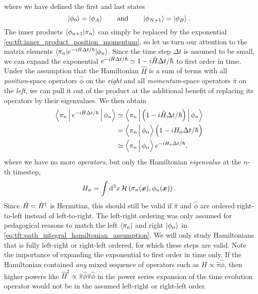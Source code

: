 where we have defined the first and last states
\begin{equation}
	\ket{\phi_0} = \ket{\phi_A}
	\qquad \text{and} \qquad
	\ket{\phi_{N+1}} = \ket{\phi_B}.
\label{eq:tft:bosonic_end_states}
\end{equation}
The inner products $\braket{\phi_{n+1} | \pi_n}$ can simply be replaced by the exponential \eqref{eq:tft:inner_product_position_momentum}, so let us turn our attention to the matrix elements $\braket{\pi_n | e^{- i \hat{H} \Delta t / \hbar} | \phi_n}$.
Since the time step $\Delta t$ is assumed to be small, we can expand the exponential $\smash[t]{e^{- i \hat{H} \Delta t / \hbar}} \simeq 1 - i \hat{H} \Delta t / \hbar$ to first order in time.
Under the assumption that the Hamiltonian $\hat{H}$ is a sum of terms with all \emph{position}-space operators $\hat{\phi}$ on the \emph{right} and all \emph{momentum}-space operators $\hat{\pi}$ on the \emph{left}, we can pull it out of the product at the additional benefit of replacing its operators by their eigenvalues.
We then obtain
\begin{equation}
\begin{split}
	\Braket{\pi_n | e^{- i \hat{H} \Delta t / \hbar} | \phi_n} &\taylor \Braket{\pi_n | \Big( 1 - i \hat{H} \Delta t / \hbar \Big) | \phi_n} \\
	                                                           &=       \Braket{\vphantom{\hat{H}} \pi_n | \phi_n} \Big( 1 - i H_n \Delta t / \hbar \Big) \\
	                                                           &\taylor \Braket{\vphantom{\hat{H}} \pi_n | \phi_n} e^{- i H_n \Delta t / \hbar}, \\
\end{split}
\label{eq:tft:path_integral_hamiltonian_assumption}
\end{equation}
where we have no more \emph{operators}, but only the Hamiltonian \emph{eigenvalue} at the $n$-th timestep,
\begin{equation}
	H_n = \int \mathop{}\!\mathrm{d}^3 x \, \mathcal{H} \left( \pi_n({\bm{x}}), \phi_n({\bm{x}}) \right) .
\label{eq:tft:hamiltonian_eigenvalues}
\end{equation}
Since $\smash[t]{\hat{H}} = \smash[t]{\hat{H}^\dagger}$ is Hermitian, this should still be valid if $\hat{\pi}$ and $\hat{\phi}$ are ordered right-to-left instead of left-to-right.
The left-right ordering was only assumed for pedagogical reasons to match the left $\bra{\pi_n}$ and right $\ket{\phi_n}$ in \cref{eq:tft:path_integral_hamiltonian_assumption}.
We will only study Hamiltonians that is fully left-right or right-left ordered, for which these steps are valid.
Note the importance of expanding the exponential to first order in time only.
If the Hamiltonian contained \emph{any} mixed sequence of operators such as $H \propto \hat{\pi} \hat{\phi}$, then higher powers like $\hat{H}^2 \propto \hat{\pi} \hat{\phi} \hat{\pi} \hat{\phi}$ in the power series expansion of the time evolution operator would not be in the assumed left-right or right-left order.

